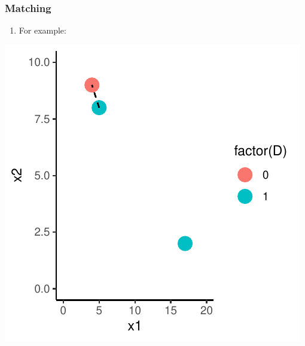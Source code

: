 \documentclass[xcolor=x11names,compress]{beamer}\usepackage[]{graphicx}\usepackage[]{color}
\makeatletter
\def\maxwidth{ %
  \ifdim\Gin@nat@width>\linewidth
    \linewidth
  \else
    \Gin@nat@width
  \fi
}
\newenvironment{knitrout}{}{} %
\renewcommand{\(}{\begin{columns}}
\renewcommand{\)}{\end{columns}}
\newcommand{\<}[1]{\begin{column}{#1}}
\renewcommand{\>}{\end{column}}
\makeatother
\begin{document}
\begin{frame}
\frametitle{Matching}
\begin{enumerate}
\item For example:
\end{enumerate}
\begin{knitrout}
\color{fgcolor}
\includegraphics[width=\maxwidth]{figure/unnamed-chunk-2-1} 

\end{knitrout}
\end{frame}
\end{document}
